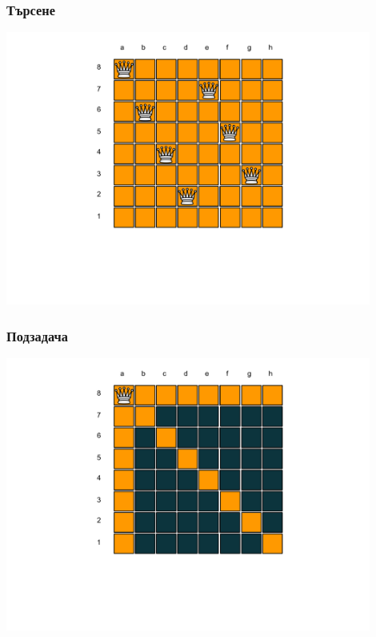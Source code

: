 \documentclass{beamer}
\begin{document}
\begin{frame}[fragile]
\frametitle{Търсене}
\begin{center}
\includegraphics[width=12cm]{images/cb_07}
\end{center}
\end{frame}


\begin{frame}[fragile]
\frametitle{Подзадача}
\begin{center}
\includegraphics[width=12cm]{images/cb_0101}
\end{center}
\end{frame}
\end{document}
